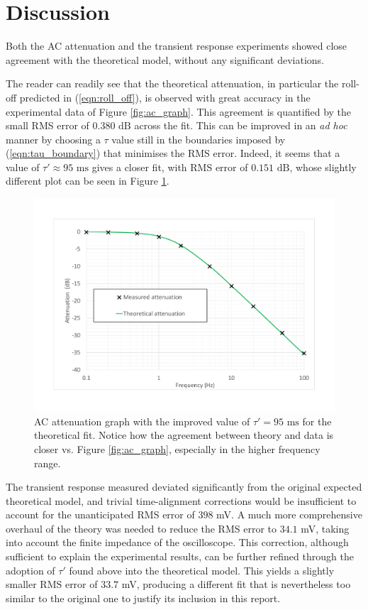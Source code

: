 \documentclass{article}
\begin{document}
\section{Discussion}
Both the AC attenuation and the transient response experiments showed close agreement with the theoretical model, without any significant deviations. 
\par The reader can readily see that the theoretical attenuation, in particular the roll-off predicted in (\ref{eqn:roll_off}), is observed with great accuracy in the experimental data of Figure \ref{fig:ac_graph}. This agreement is quantified by the small RMS error of $0.380 \text{ dB}$ across the fit. This can be improved in an \textit{ad hoc} manner by choosing a $\tau$ value still in the boundaries imposed by (\ref{eqn:tau_boundary}) that minimises the RMS error. Indeed, it seems that a value of $\tau ' \approx 95\text{ ms}$ gives a closer fit, with RMS error of  $0.151 \text{ dB}$, whose slightly different plot can be seen in Figure \ref{fig:ac_graph_corrected}.
\begin{figure}[!htb]
    \centering
    \includegraphics[width=\linewidth]{ac_graph_corrected.pdf}
    \caption{AC attenuation graph with the improved value of $\tau' = 95\text{ ms}$ for the theoretical fit. Notice how the agreement between theory and data is closer vs. Figure \ref{fig:ac_graph}, especially in the higher frequency range.}
    \label{fig:ac_graph_corrected}
\end{figure}
\par The transient response measured deviated significantly from the original expected theoretical model, and trivial time-alignment corrections would be insufficient to account for the unanticipated RMS error of $398$ mV. A much more comprehensive overhaul of the theory was needed to reduce the RMS error to $34.1$ mV, taking into account the finite impedance of the oscilloscope. This correction, although sufficient to explain the experimental results, can be further refined through the adoption of $\tau'$ found above into the theoretical model. This yields a slightly smaller RMS error of $33.7$ mV, producing a different fit that is nevertheless too similar to the original one to justify its inclusion in this report.  
\end{document}
